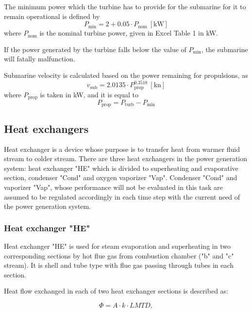 \documentclass{article}
\begin{document}
	The minimum power which the turbine has to provide for the submarine for it 
	to remain operational is defined by
	\begin{equation}
	P_\textrm{min} = 2 + 0.05 \cdot P_\textrm{nom} \ \left[\textrm{kW}\right]
	\end{equation}
	where $P_\textrm{nom}$ is the nominal turbine power, given in Excel Table 1 
	in kW.

	If the power generated by the turbine falls below the value of 
	$P_\textrm{min}$, the submarine will fatally malfunction.

	Submarine velocity is calculated based on the power remaining for 
	propulsions, as
	\begin{equation}
	v_\textrm{sub} = 2.0135 \cdot P_\textrm{prop}^{0.3518} \ 
	\left[\textrm{kn}\right]
	\end{equation}
	where $P_\textrm{prop}$ is taken in kW, and it is equal to
	\begin{equation}
	P_\textrm{prop} = P_\textrm{turb} - P_\textrm{min}
	\end{equation}
	
	\subsection{Heat exchangers}
	
	Heat exchanger is a device whose purpose is to transfer heat from warmer 
	fluid stream to colder stream. There are three heat exchangers in the power 
	generation system: heat exchanger "HE" which is divided to superheating and 
	evaporative section, condenser "Cond" and oxygen vaporizer "Vap". Condenser 
	"Cond" and vaporizer "Vap", whose performance will not be evaluated in this 
	task are assumed to be regulated accordingly in each time step with the 
	current need of the power generation system. 
	
	\subsubsection*{Heat exchanger "HE"}
	
	Heat exchanger "HE" is used for steam evaporation and superheating in two corresponding sections by hot flue gas from combustion chamber ("b" and "c" stream). It is shell and tube type with flue gas passing through tubes in each section. 
	
	Heat flow exchanged in each of two heat exchanger sections is described as:
	
	\begin{equation}\label{eq:heat_flow}
		\Phi = A \cdot k \cdot LMTD,
	\end{equation}
	
\end{document}
